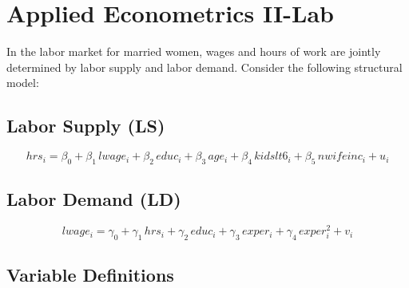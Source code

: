 \documentclass[12pt]{article}
\begin{document}
\section*{Applied Econometrics II-Lab}

In the labor market for married women, wages and hours of work are jointly determined by labor supply and labor demand. Consider the following structural model:

\subsection*{Labor Supply (LS)}

\begin{equation}
hrs_i = \beta_0 + \beta_1 \, lwage_i + \beta_2 \, educ_i + \beta_3 \, age_i + \beta_4 \, kidslt6_i + \beta_5 \, nwifeinc_i + u_i
\end{equation}

\subsection*{Labor Demand (LD)}

\begin{equation}
lwage_i = \gamma_0 + \gamma_1 \, hrs_i + \gamma_2 \, educ_i + \gamma_3 \, exper_i + \gamma_4 \, exper_i^2 + v_i
\end{equation}

\subsection*{Variable Definitions}
\end{document}
